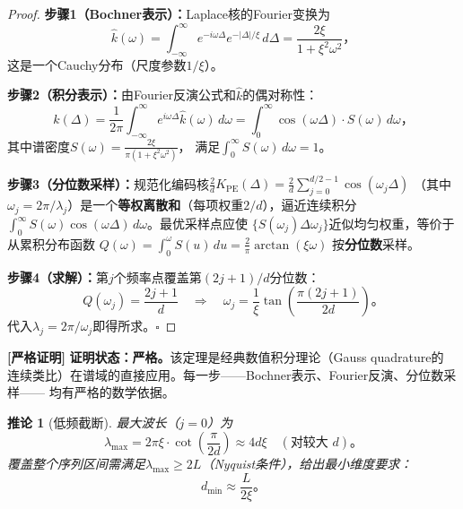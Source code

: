 \documentclass[11pt,a4paper]{article}
\newtheorem{corollary}[theorem]{推论}
\theoremstyle{remark}
\DeclareMathOperator{\PE}{PE}
\newcommand{\rigorous}{\textnormal{\textbf{[严格证明]}}}
\begin{document}
\begin{proof}
\textbf{步骤1（Bochner表示）：}Laplace核的Fourier变换为
\begin{equation}
    \hat{k}(\omega) = \int_{-\infty}^{\infty} e^{-i\omega\Delta} e^{-|\Delta|/\xi}\,d\Delta
    = \frac{2\xi}{1 + \xi^2\omega^2}，
\end{equation}
这是一个Cauchy分布（尺度参数$1/\xi$）。

\textbf{步骤2（积分表示）：}由Fourier反演公式和$\hat{k}$的偶对称性：
\begin{equation}
    k(\Delta) = \frac{1}{2\pi}\int_{-\infty}^{\infty} e^{i\omega\Delta}\hat{k}(\omega)\,d\omega
    = \int_{0}^{\infty} \cos(\omega\Delta) \cdot S(\omega)\,d\omega，
\end{equation}
其中谱密度$S(\omega) = \frac{2\xi}{\pi(1 + \xi^2\omega^2)}$，
满足$\int_0^{\infty} S(\omega)\,d\omega = 1$。

\textbf{步骤3（分位数采样）：}规范化编码核$\frac{2}{d}K_{\PE}(\Delta) = \frac{2}{d}\sum_{j=0}^{d/2-1} \cos(\omega_j \Delta)$
（其中$\omega_j = 2\pi/\lambda_j$）是一个\textbf{等权离散和}（每项权重$2/d$），逼近连续积分
$\int_0^{\infty} S(\omega)\cos(\omega\Delta)\,d\omega$。最优采样点应使
$\{S(\omega_j)\Delta\omega_j\}$近似均匀权重，等价于从累积分布函数
$Q(\omega) = \int_0^{\omega} S(u)\,du = \frac{2}{\pi}\arctan(\xi\omega)$
按\textbf{分位数}采样。

\textbf{步骤4（求解）：}第$j$个频率点覆盖第$(2j+1)/d$分位数：
\begin{equation}
    Q(\omega_j) = \frac{2j+1}{d} \quad\Longrightarrow\quad
    \omega_j = \frac{1}{\xi}\tan\!\left(\frac{\pi(2j+1)}{2d}\right)。
\end{equation}
代入$\lambda_j = 2\pi/\omega_j$即得所求。\hfill $\square$
\end{proof}

\rigorous{} \textbf{证明状态：严格。}该定理是经典数值积分理论（Gauss quadrature的
连续类比）在谱域的直接应用。每一步——Bochner表示、Fourier反演、分位数采样——
均有严格的数学依据。

\begin{corollary}[低频截断]
\label{cor:1.2.1}
最大波长（$j=0$）为
\begin{equation}
    \lambda_{\max} = 2\pi\xi \cdot \cot\!\left(\frac{\pi}{2d}\right)
    \approx 4d\xi \quad (\text{对较大 } d)。
\end{equation}
覆盖整个序列区间需满足$\lambda_{\max} \geq 2L$（Nyquist条件），给出最小维度要求：
\begin{equation}
    \boxed{d_{\min} \approx \frac{L}{2\xi}}。
\end{equation}
\end{corollary}
\end{document}
